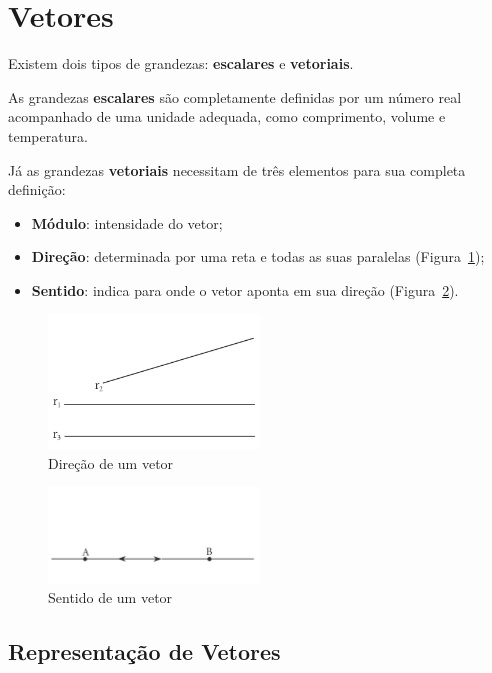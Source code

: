 \section{Vetores}

Existem dois tipos de grandezas: \textbf{escalares} e \textbf{vetoriais}.

As grandezas \textbf{escalares} são completamente definidas por um número real
acompanhado de uma unidade adequada, como comprimento, volume e temperatura.

Já as grandezas \textbf{vetoriais} necessitam de três elementos para sua
completa definição:

\begin{itemize}
    \item \textbf{Módulo}: intensidade do vetor;
    \item \textbf{Direção}: determinada por uma reta e todas as suas paralelas
    (Figura~\ref{fig:fig1.1a});
    \item \textbf{Sentido}: indica para onde o vetor aponta em sua direção
    (Figura~\ref{fig:fig1.1b}).
\end{itemize}

\begin{figure}[H]
    \centering
    \includegraphics[width=0.5\textwidth]{./fig/fig1.1a.png}
    \caption{Direção de um vetor}\label{fig:fig1.1a}
\end{figure}

\begin{figure}[H]
    \centering
    \includegraphics[width=0.5\textwidth]{./fig/fig1.1b.png}
    \caption{Sentido de um vetor}\label{fig:fig1.1b}
\end{figure}

\subsection{Representação de Vetores}

